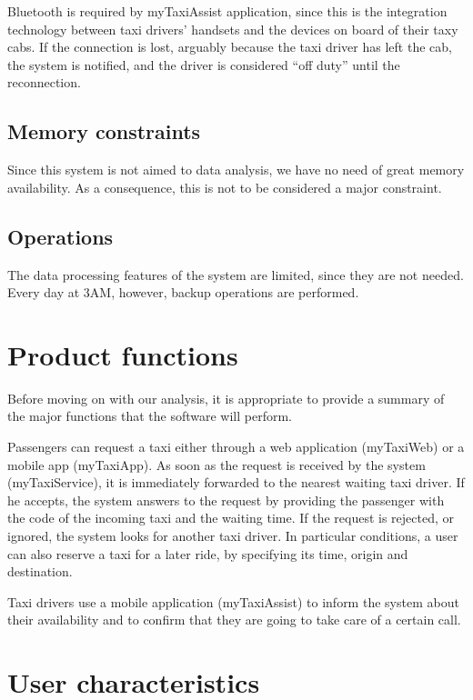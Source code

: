 Bluetooth is required by myTaxiAssist application, since this is the integration technology between taxi drivers’ handsets and the devices on board of their taxy cabs. If the connection is lost, arguably because the taxi driver has left the cab, the system is notified, and the driver is considered “off duty” until the reconnection.


\subsection{Memory constraints}

Since this system is not aimed to data analysis, we have no need of great memory availability. As a consequence, this is not to be considered a major constraint.


\subsection{Operations}

The data processing features of the system are limited, since they are not needed. Every day at 3AM, however, backup operations are performed. 


\section{Product functions}  

Before moving on with our analysis, it is appropriate to provide a summary of the major functions that the software will perform. 

Passengers can request a taxi either through a web application (myTaxiWeb) or a mobile app (myTaxiApp). As soon as the request is received by the system (myTaxiService), it is immediately forwarded to the nearest waiting taxi driver. If he accepts, the system answers to the request by providing the passenger with the code of the incoming taxi and the waiting time. If the request is rejected, or ignored, the system looks for another taxi driver. In particular conditions, a user can also reserve a taxi for a later ride, by specifying its time, origin and destination. 

Taxi drivers use a mobile application (myTaxiAssist) to inform the system about their availability and to confirm that they are going to take care of a certain call. 


\section{User characteristics}

